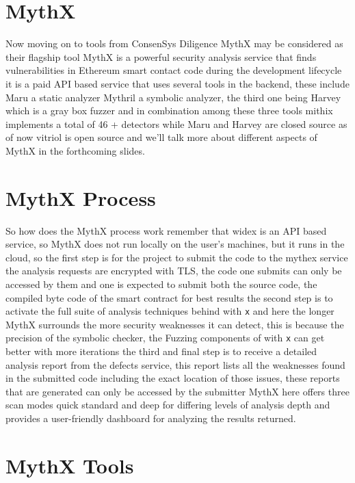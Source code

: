 \section{MythX}

Now moving on to tools from ConsenSys Diligence MythX may be considered as their flagship tool MythX is a powerful security analysis service that finds vulnerabilities in Ethereum smart contact code during the development lifecycle it is a paid API based service that uses several tools in the backend, these include Maru a static analyzer Mythril a symbolic analyzer, the third one being Harvey which is a gray box fuzzer and in combination among these three tools mithix implements a total of 46 + detectors while Maru and Harvey are closed source as of now vitriol is open source and we'll talk more about different aspects of MythX in the forthcoming slides.

\section{MythX Process}

So how does the MythX process work remember that widex is an API based service, so MythX does not run locally on the user's machines, but it runs in the cloud, so the first step is for the project to submit the code to the mythex service the analysis requests are encrypted with TLS, the code one submits can only be accessed by them and one is expected to submit both the source code, the compiled byte code of the smart contract for best results the second step is to activate the full suite of analysis techniques behind with \verb|x| and here the longer MythX surrounds the more security weaknesses it can detect, this is because the precision of the symbolic checker, the Fuzzing components of with \verb|x| can get better with more iterations the third and final step is to receive a detailed analysis report from the defects service, this report lists all the weaknesses found in the submitted code including the exact location of those issues, these reports that are generated can only be accessed by the submitter MythX here offers three scan modes quick standard and deep for differing levels of analysis depth and provides a user-friendly dashboard for analyzing the results returned.

\section{MythX Tools}

